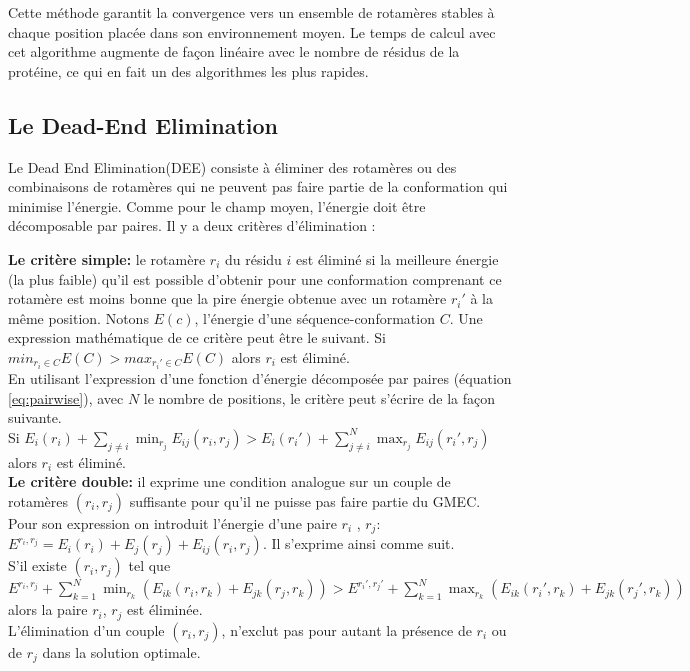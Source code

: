 Cette méthode garantit la convergence vers un ensemble de rotamères stables à chaque position placée dans son \og environnement moyen\fg . Le temps de calcul avec cet algorithme augmente  de façon linéaire avec le nombre de résidus de la protéine, ce qui en fait un des algorithmes les plus rapides.

\subsection{Le Dead-End Elimination}

Le \og Dead End Elimination\fg (DEE)  consiste à éliminer des rotamères ou des combinaisons de rotamères qui ne peuvent pas faire partie de la conformation qui minimise l'énergie. Comme pour le champ moyen, l'énergie doit être décomposable par paires. Il y a deux critères d'élimination \cite{Desmet92}:


\textbf{Le critère simple:} le rotamère $r_i$ du résidu $i$ est éliminé si la meilleure énergie (la plus faible) qu'il est possible d'obtenir pour une conformation comprenant ce rotamère est moins bonne que la pire énergie obtenue avec un rotamère $r_i'$  à la même position. Notons $E(c)$, l'énergie d'une séquence-conformation $C$. Une expression mathématique de ce critère peut être le suivant.
Si $min_{r_i \in C }E(C) > max_{r_i' \in C} E(C) $ alors $r_i$ est éliminé. \\
En utilisant l'expression d'une fonction d'énergie décomposée par paires (équation \vref{eq:pairwise}), avec $N$ le nombre de positions, le critère peut s'écrire de la façon suivante.\\
Si $E_i(r_i) + \sum_{j\neq i} \min_{r_j} E_{ij}(r_i,r_j) > E_i(r_i') + \sum_{j\neq i}^{N} \max_{r_j}E_{ij}(r_i',r_j)$ alors $r_i$ est éliminé.\\ 


\textbf{Le critère double:} il exprime une condition analogue sur un couple de rotamères $(r_i,r_j)$ suffisante pour qu'il ne puisse pas faire partie du GMEC. Pour son expression on introduit l'énergie d'une paire $r_i$ , $r_j$: $E^{r_i,r_j} = E_i(r_i) + E_j(r_j) + E_{ij}(r_i,r_j)$. Il s'exprime ainsi comme suit.\\
S'il existe $(r_i,r_j)$ tel que\\
$E^{r_i,r_j} + \sum_{k=1}^N \min_{r_k} (E_{ik}(r_i,r_k) + E_{jk}(r_j,r_k)) >  E^{r_i',r_j'} + \sum_{k=1}^N \max_{r_k} (E_{ik}(r_i',r_k) + E_{jk}(r_j',r_k))$ \\
alors la paire $r_i$, $r_j$ est éliminée.\\
L'élimination d'un couple $(r_i,r_j)$, n'exclut pas pour autant la présence de $r_i$ ou de $r_j$ dans la solution optimale. 

